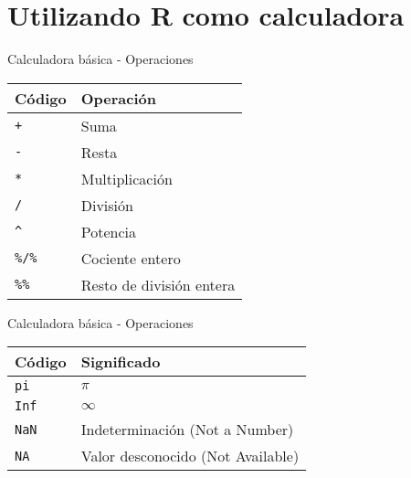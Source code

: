 \documentclass[
  ignorenonframetext,
]{beamer}
\begin{document}
\hypertarget{utilizando-r-como-calculadora}{%
\section{Utilizando R como
calculadora}\label{utilizando-r-como-calculadora}}

\begin{frame}[fragile]{Calculadora básica - Operaciones}
\protect\hypertarget{calculadora-buxe1sica---operaciones}{}
\begin{longtable}[]{@{}ll@{}}
\toprule
Código & Operación \\
\midrule
\endhead
\texttt{+} & Suma \\
\texttt{-} & Resta \\
\texttt{*} & Multiplicación \\
\texttt{/} & División \\
\texttt{\^{}} & Potencia \\
\texttt{\%/\%} & Cociente entero \\
\texttt{\%\%} & Resto de división entera \\
\bottomrule
\end{longtable}
\end{frame}

\begin{frame}[fragile]{Calculadora básica - Operaciones}
\protect\hypertarget{calculadora-buxe1sica---operaciones-1}{}
\begin{longtable}[]{@{}ll@{}}
\toprule
Código & Significado \\
\midrule
\endhead
\texttt{pi} & \href{https://es.wikipedia.org/wiki/Número_π}{\(\pi\)} \\
\texttt{Inf} &
\href{https://es.wikipedia.org/wiki/Infinito}{\(\infty\)} \\
\texttt{NaN} & Indeterminación (Not a Number) \\
\texttt{NA} & Valor desconocido (Not Available) \\
\bottomrule
\end{longtable}
\end{frame}
\end{document}
